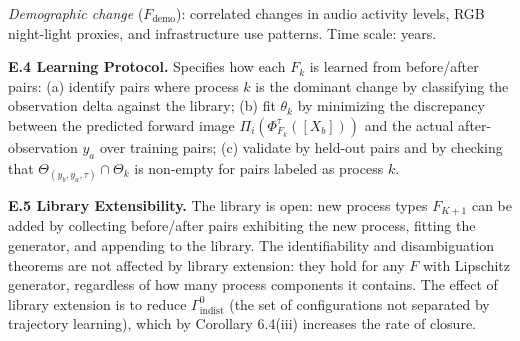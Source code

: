 \documentclass[12pt, oneside]{article}
\begin{document}
{\textit{Demographic change} ($F_{\mathrm{demo}}$): correlated changes in audio activity
levels, RGB night-light proxies, and infrastructure use patterns. Time scale: years.

\medskip
\textbf{E.4 Learning Protocol.}
Specifies how each $F_k$ is learned from before/after pairs: (a) identify pairs where
process $k$ is the dominant change by classifying the observation delta against the
library; (b) fit $\theta_k$ by minimizing the discrepancy between the predicted
forward image $\Pi_i(\Phi^\tau_{F_k}([X_b]))$ and the actual after-observation $y_a$
over training pairs; (c) validate by held-out pairs and by checking that
$\Theta_{(y_b,y_a,\tau)} \cap \Theta_k$ is non-empty for pairs labeled as process $k$.

\medskip
\textbf{E.5 Library Extensibility.}
The library is open: new process types $F_{K+1}$ can be added by collecting before/after
pairs exhibiting the new process, fitting the generator, and appending to the library.
The identifiability and disambiguation theorems are not affected by library extension:
they hold for any $F$ with Lipschitz generator, regardless of how many process components
it contains. The effect of library extension is to reduce $\Gamma^0_{\mathrm{indist}}$
(the set of configurations not separated by trajectory learning), which by
Corollary 6.4(iii) increases the rate of closure.
}
\end{document}
